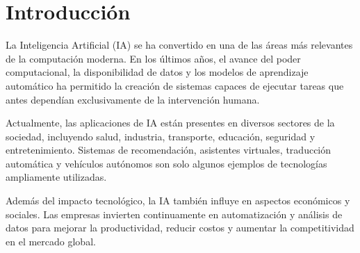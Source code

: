 \section{Introducción}

La Inteligencia Artificial (IA) se ha convertido en una de las áreas más relevantes de la computación moderna.
En los últimos años, el avance del poder computacional, la disponibilidad de datos y los modelos
de aprendizaje automático ha permitido la creación de sistemas capaces de ejecutar tareas que
antes dependían exclusivamente de la intervención humana.

Actualmente, las aplicaciones de IA están presentes en diversos sectores de la sociedad, incluyendo salud,
industria, transporte, educación, seguridad y entretenimiento. Sistemas de recomendación,
asistentes virtuales, traducción automática y vehículos autónomos son solo algunos ejemplos
de tecnologías ampliamente utilizadas.

Además del impacto tecnológico, la IA también influye en aspectos económicos y sociales. Las empresas
invierten continuamente en automatización y análisis de datos para mejorar la productividad,
reducir costos y aumentar la competitividad en el mercado global. 